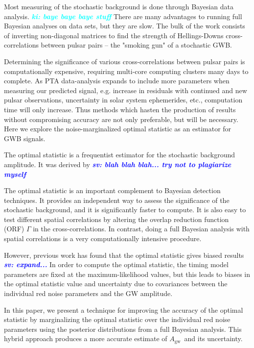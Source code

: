 \documentclass[twocolumn,aps,prd,superscriptaddress]{revtex4-1}
\newcommand{\sv}[1]{\textcolor{blue}{\it{\textbf{sv: #1}}} }
\newcommand{\ki}[1]{\textcolor{cyan}{\it{\textbf{ki: #1}}} }
\newcommand{\Agw}{\ensuremath{A_\mathrm{gw}}}
\begin{document}
Most measuring of the stochastic background is done through Bayesian data analysis. \ki{baye baye baye stuff} There are many advantages to running full Bayesian analyses on data sets, but they are slow. The bulk of the work consists of inverting non-diagonal matrices to find the strength of Hellings-Downs cross-correlations between pulsar pairs -- the "smoking gun" of a stochastic GWB.    

Determining the significance of various cross-correlations between pulsar pairs is computationally expensive, requiring multi-core computing clusters many days to complete. As PTA data-analysis expands to include more parameters when measuring our predicted signal, e.g. increase in residuals with continued and new pulsar observations, uncertainty in solar system ephemerides, etc., computation time will only increase. Thus methods which hasten the production of results without compromising accuracy are not only preferable, but will be necessary. Here we explore the noise-marginalized optimal statistic as an estimator for GWB signals.

The optimal statistic is a frequentist estimator for the stochastic background amplitude. 
It was derived by \citet{abc+2009} \sv{blah blah blah... try not to plagiarize myself}

The optimal statistic is an important complement to Bayesian detection techniques. 
It provides an independent way to assess the significance of the stochastic background, 
and it is significantly faster to compute. It is also easy to test different spatial correlations 
by altering the overlap reduction function (ORF) $\Gamma$ in the cross-correlations. 
In contrast, doing a full Bayesian analysis with spatial correlations is a very computationally 
intensive procedure.

However, previous work has found that the optimal statistic gives biased results \sv{expand...} 
In order to compute the optimal statistic, the timing model parameters are fixed 
at the maximum-likelihood values, but this leads to biases in the 
optimal statistic value and uncertainty due to covariances between the 
individual red noise parameters and the GW amplitude. 

In this paper, we present a technique for improving the accuracy of the optimal statistic 
by marginalizing the optimal statistic over the individual red noise parameters 
using the posterior distributions from a full Bayesian analysis. 
This hybrid approach produces a more accurate 
estimate of \Agw\ and its uncertainty.
\end{document}
